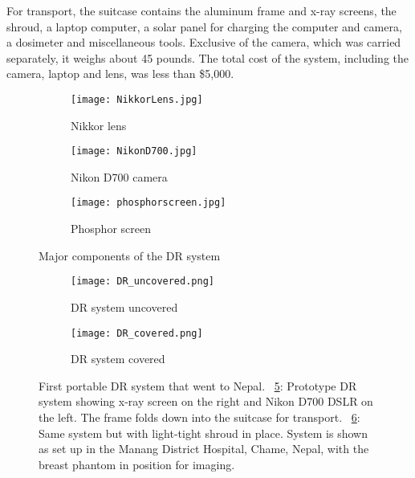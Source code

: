 For transport, the suitcase contains the aluminum frame and x-ray screens, the shroud, a laptop computer, a solar panel for charging the computer and camera, a dosimeter and miscellaneous tools. Exclusive of the camera, which was carried separately, it weighs about 45 pounds. The total cost of the system, including the camera, laptop and lens, was less than \$5,000.

\begin{figure}[h]
	\begin{subfigure}[b]{0.3\linewidth}
		\centering
		\texttt{[image: NikkorLens.jpg]}
		\caption{Nikkor lens}
		\label{fig:nikonlens}
	\end{subfigure}
	\hspace{0.2cm}
	\begin{subfigure}[b]{0.3\linewidth}
		\centering
		\texttt{[image: NikonD700.jpg]}
		\caption{Nikon D700 camera}
		\label{fig:nikoncamera}
	\end{subfigure}
	\hspace{0.2cm}
	\begin{subfigure}[b]{0.3\linewidth}
		\texttt{[image: phosphorscreen.jpg]}
		\caption{Phosphor screen}
		\label{fig:phosphorscreen}
	\end{subfigure}
\caption{Major components of the DR system}
\label{fig:DRcomponents}
\end{figure}

\begin{figure}[h]
\centering
	\begin{subfigure}[b]{0.45\linewidth}
	\texttt{[image: DR\_uncovered.png]}
	\caption{DR system uncovered}
	\label{fig:DR1uncovered}
	\end{subfigure}
\hspace{0.2cm}
	\begin{subfigure}[b]{0.45\linewidth}
	\centering
	\texttt{[image: DR\_covered.png]}
	\caption{DR system covered}
	\label{fig:DR1covered}
	\end{subfigure}
\caption{First portable DR system that went to Nepal.  ~\ref{fig:DR1uncovered}: Prototype DR system showing x-ray screen on the right and Nikon D700 DSLR on the left.  The frame folds down into the suitcase for transport.  ~\ref{fig:DR1covered}: Same system but with light-tight shroud in place.  System is shown as set up in the Manang District Hospital, Chame, Nepal, with the breast phantom in position for imaging.}
\label{fig:DR1}
\end{figure}

